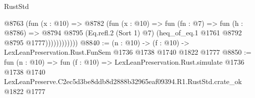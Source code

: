 \begin{lexlean}{RustStd}
\begin{coremodule}
                    @8763
                      (fun (x : @10) =>
                      @8782
                        (fun (x : @10) =>
                        fun (fn : @7) =>
                        fun (h : @8786) =>
                        @8794
                          @8795
                          (Eq.refl.{2} (Sort 1) @7)
                          (heq_of_eq.{1} @1761 @8792 @8795 @1777))))))))))))
@8840 := (n : @10) -> (f : @10) -> LexLeanPreservation.Rust.FunSem @1736 @1738 @1740 @1822 @1777
@8850 := fun (n : @10) =>
  fun (f : @10) =>
  LexLeanPreservation.Rust.simulate
    @1736
    @1738
    @1740
    LexLeanPreserve.C2ec5d3be8ddb8d2888b32965eaf09394.R1.RustStd.crate_ok
    @1822
    @1777
\end{coremodule}
\end{lexlean}
